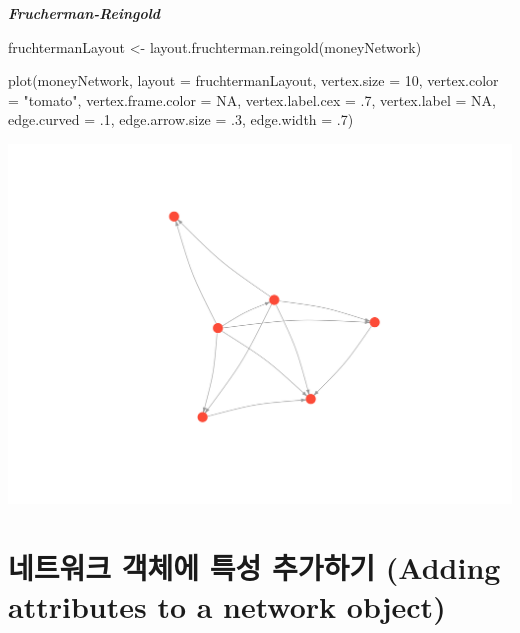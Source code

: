 \documentclass[
]{book}
\newenvironment{Shaded}{\begin{snugshade}}{\end{snugshade}}
\newcommand{\AttributeTok}[1]{\textcolor[rgb]{0.77,0.63,0.00}{#1}}
\newcommand{\ConstantTok}[1]{\textcolor[rgb]{0.00,0.00,0.00}{#1}}
\newcommand{\DecValTok}[1]{\textcolor[rgb]{0.00,0.00,0.81}{#1}}
\newcommand{\FunctionTok}[1]{\textcolor[rgb]{0.00,0.00,0.00}{#1}}
\newcommand{\NormalTok}[1]{#1}
\newcommand{\OtherTok}[1]{\textcolor[rgb]{0.56,0.35,0.01}{#1}}
\newcommand{\StringTok}[1]{\textcolor[rgb]{0.31,0.60,0.02}{#1}}
\begin{document}
\textbf{\emph{Frucherman-Reingold}}

\begin{Shaded}
\begin{Highlighting}[]
\NormalTok{fruchtermanLayout }\OtherTok{\textless{}{-}} \FunctionTok{layout.fruchterman.reingold}\NormalTok{(moneyNetwork)}

\FunctionTok{plot}\NormalTok{(moneyNetwork, }\AttributeTok{layout =}\NormalTok{ fruchtermanLayout, }\AttributeTok{vertex.size =} \DecValTok{10}\NormalTok{, }\AttributeTok{vertex.color =} \StringTok{"tomato"}\NormalTok{, }\AttributeTok{vertex.frame.color =} \ConstantTok{NA}\NormalTok{, }\AttributeTok{vertex.label.cex =}\NormalTok{ .}\DecValTok{7}\NormalTok{, }\AttributeTok{vertex.label =} \ConstantTok{NA}\NormalTok{, }\AttributeTok{edge.curved =}\NormalTok{ .}\DecValTok{1}\NormalTok{, }\AttributeTok{edge.arrow.size =}\NormalTok{ .}\DecValTok{3}\NormalTok{, }\AttributeTok{edge.width =}\NormalTok{ .}\DecValTok{7}\NormalTok{)}
\end{Highlighting}
\end{Shaded}

\begin{center}\includegraphics[width=0.8\linewidth]{images/10} \end{center}

\hypertarget{uxb124uxd2b8uxc6ccuxd06c-uxac1duxccb4uxc5d0-uxd2b9uxc131-uxcd94uxac00uxd558uxae30-adding-attributes-to-a-network-object}{%
\section{네트워크 객체에 특성 추가하기 (Adding attributes to a network object)}\label{uxb124uxd2b8uxc6ccuxd06c-uxac1duxccb4uxc5d0-uxd2b9uxc131-uxcd94uxac00uxd558uxae30-adding-attributes-to-a-network-object}}
\end{document}
